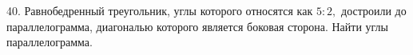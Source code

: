 40. Равнобедренный треугольник, углы которого относятся как $5:2,$ достроили до параллелограмма, диагональю которого является боковая сторона. Найти углы параллелограмма.\\
